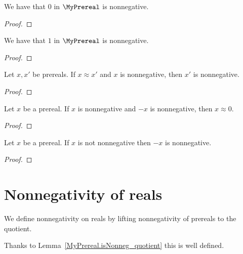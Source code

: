 \begin{lemma}
    \leanok
    We have that $0$ in $\MyPrereal$ is nonnegative.
\end{lemma}
\begin{proof}
    \leanok
\end{proof}

\begin{lemma}
    \leanok
    We have that $1$ in $\MyPrereal$ is nonnegative.
\end{lemma}
\begin{proof}
    \leanok
\end{proof}

\begin{lemma}
    \leanok
    Let $x,x'$ be prereals.
    If $x \approx x'$ and $x$ is nonnegative, then $x'$ is nonnegative.
\end{lemma}
\begin{proof}
\end{proof}

\begin{lemma}
    \leanok
    Let $x$ be a prereal.
    If $x$ is nonnegative and $-x$ is nonnegative, then $x \approx 0$.
\end{lemma}
\begin{proof}
    \leanok
\end{proof}

\begin{lemma}
    \leanok
    Let $x$ be a prereal.
    If $x$ is not nonnegative then $-x$ is nonnegative.
\end{lemma}
\begin{proof}
\end{proof}

\section{Nonnegativity of reals}

\begin{definition}
    \leanok
    We define nonnegativity on reals by lifting nonnegativity of prereals to the quotient.

    Thanks to Lemma~\ref{MyPrereal.isNonneg_quotient} this is well defined.
\end{definition}

